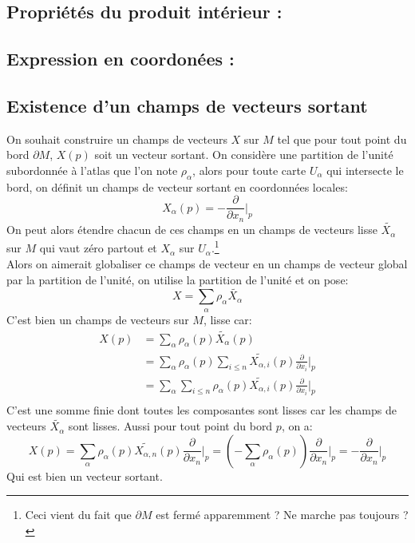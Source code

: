   \subsection*{Propriétés du produit intérieur {:}}
   \subsection*{Expression en coordonées {:}}
   
   \subsection*{Existence d'un champs de vecteurs sortant}
      On souhait construire un champs de vecteurs $X$ sur $M$ tel que pour tout point du bord $\partial M$, $X(p)$ soit un vecteur sortant. On considère une partition de l'unité subordonnée à l'atlas que l'on note $\rho_\alpha$, alors pour toute carte $U_\alpha$ qui intersecte le bord, on définit un champs de vecteur sortant en coordonnées locales:
      $$
         X_\alpha(p) = -\frac{\partial}{\partial x_n}\bigg|_p
      $$
      {\color{red}On peut alors étendre chacun de ces champs en un champs de vecteurs lisse $\widetilde{X_\alpha}$ sur $M$ qui vaut zéro partout et $X_\alpha$ sur $U_\alpha$.}\footnote{Ceci vient du fait que $\partial M$ est fermé apparemment ? Ne marche pas toujours ?}\\
      
      Alors on aimerait globaliser ce champs de vecteur en un champs de vecteur global par la partition de l'unité, on utilise la partition de l'unité et on pose:
      $$
         X = \sum_\alpha \rho_\alpha \widetilde{X_\alpha}
      $$
      C'est bien un champs de vecteurs sur $M$, lisse car: 
      \begin{align*}
         X(p) &= \sum_\alpha \rho_\alpha(p) \widetilde{X_\alpha}(p) \\
         &= \sum_\alpha \rho_\alpha(p) \sum_{i \leq n}\widetilde{X_{\alpha,i}}(p)\frac{\partial}{\partial x_i}\bigg|_p\\
         &= \sum_\alpha\sum_{i \leq n} \rho_\alpha(p)\widetilde{X_{\alpha,i}}(p)\frac{\partial}{\partial x_i}\bigg|_p\\
      \end{align*}
      C'est une somme finie dont toutes les composantes sont lisses car les champs de vecteurs $\widetilde{X_\alpha}$ sont lisses. Aussi pour tout point du bord $p$, on a:
      $$
         X(p) = \sum_\alpha \rho_\alpha(p)\widetilde{X_{\alpha,n}}(p)\frac{\partial}{\partial x_n}\bigg|_p = \left(- \sum_\alpha \rho_\alpha(p)\right)\frac{\partial}{\partial x_n}\bigg|_p = -\frac{\partial}{\partial x_n}\bigg|_p
      $$
      Qui est bien un vecteur sortant.
